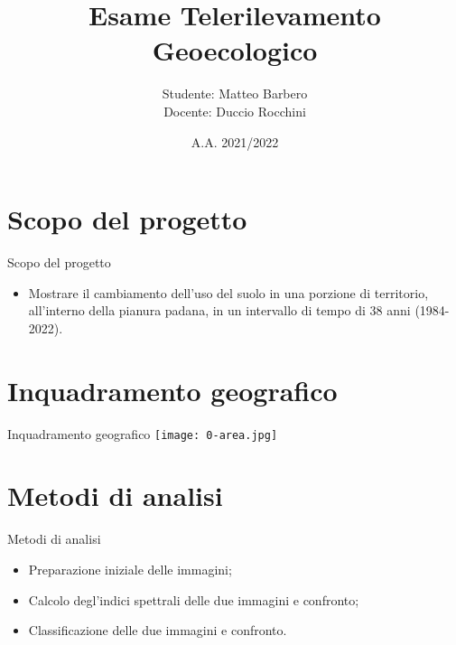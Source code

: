 \documentclass{beamer}
\title{Esame Telerilevamento Geoecologico}
\institute{Alma Mater Studiorum - Università di Bologna\\Telerilevamento Geo-Ecologico}
\author{Studente: Matteo Barbero\\Docente: Duccio Rocchini}
\date{A.A. 2021/2022}
\begin{document}
\maketitle



\section{Scopo del progetto}

\begin{frame}{Scopo del progetto}
\begin{itemize}
    \item  Mostrare il cambiamento dell'uso del suolo in una porzione di territorio, all'interno della pianura padana, in un intervallo di tempo di 38 anni (1984-2022).
\end{itemize}
\end{frame}


\section{Inquadramento geografico}

\begin{frame}{Inquadramento geografico}
    \texttt{[image: 0-area.jpg]}
    \centering
\end{frame}


\section{Metodi di analisi}

\begin{frame}{Metodi di analisi}
\begin{itemize}
    \item Preparazione iniziale delle immagini;
    
    \bigskip
    
    \item \pause Calcolo degl'indici spettrali delle due immagini e confronto;
    
    \bigskip
    
    \item \pause Classificazione delle due immagini e confronto.
\end{itemize}    
\end{frame}
\end{document}
